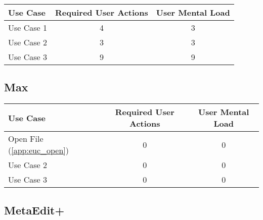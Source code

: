 \begin{tabularx}{\textwidth}{Xcc}
\textbf{Use Case} & \textbf{Required User Actions} & \textbf{User Mental Load}\\
\hline
Use Case 1                          & 4 & 3 \\
Use Case 2                          & 3 & 3 \\
Use Case 3                          & 9 & 9
\end{tabularx}

\subsection*{Max}

\begin{tabularx}{\textwidth}{Xcc}
\textbf{Use Case} & \textbf{Required User Actions} & \textbf{User Mental Load}\\
\hline
Open File (\ref{app:euc_open}) & 0 & 0 \\
Use Case 2                     & 0 & 0 \\
Use Case 3                     & 0 & 0
\end{tabularx}

\subsection*{MetaEdit+}




